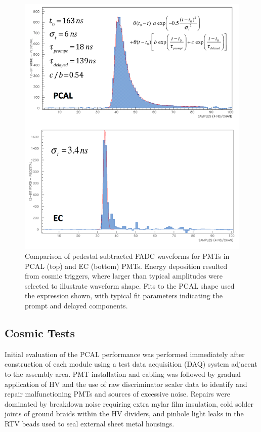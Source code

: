 \begin{figure}[hbt]
\centering
\includegraphics[width=0.95\columnwidth,keepaspectratio]{img/S5_3.png}
\caption{Comparison of pedestal-subtracted FADC waveforms for PMTs in PCAL (top) and EC (bottom) PMTs.
  Energy deposition resulted from cosmic triggers, where larger than typical amplitudes were selected to
  illustrate waveform shape. Fits to the PCAL shape used the expression shown, with typical fit parameters
  indicating the prompt and delayed components.}
\label{fig:S5_3}
\end{figure}

\subsection{Cosmic Tests}

\label{CRT}

Initial evaluation of the PCAL performance was performed immediately after construction of each module using a
test data acquisition (DAQ) system adjacent to the assembly area. PMT installation and cabling was followed by
gradual application of HV and the use of raw discriminator scaler data to identify and repair malfunctioning PMTs
and sources of excessive noise. Repairs were dominated by breakdown noise requiring extra mylar film insulation,
cold solder joints of ground braids within the HV dividers, and pinhole light leaks in the RTV beads used to seal
external sheet metal housings. 

